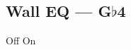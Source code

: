 \subsection[Wall EQ]{Wall EQ --- \UiKey{\SET}G$\flat$4}









































Off
On

